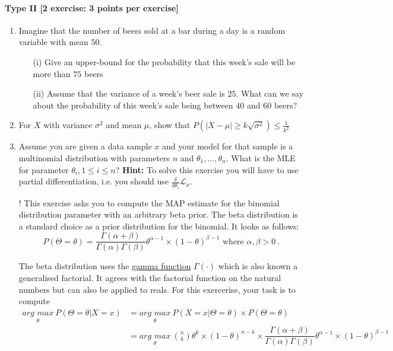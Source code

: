 \documentclass{article}
\begin{document}
\paragraph{Type II [2 exercise: 3 points per exercise]}
\begin{enumerate}
	\item Imagine that the number of beers sold at a bar during a day is a random variable with mean $50$.
		\begin{itemize}
			\item[(i)] Give an upper-bound for the probability that this week's sale will be more than $75$ beers
			\item[(ii)] Assume that the variance of a week's beer sale is $25$. What can we say about the probability of this week's sale being between $40$ and $60$ beers?
		\end{itemize}
	
	\item For $X$ with variance $\sigma^2$ and mean $\mu$, show that $P(|X-\mu| \geq k\sqrt{\sigma^2}) \leq \frac{1}{k^2}$
	
	\item Assume you are given a data sample $ x $ and your model for that sample is a multinomial distribution with parameters $ n $ and 
	$ \theta_{1}, \ldots, \theta_{n} $. What is the MLE for parameter $ \theta_{i}, 1 \leq i \leq n $? \textbf{Hint:} To solve this exercise you will
	have to use partial differentiation, i.e. you should use $ \frac{\delta}{\delta\theta_{i}}\mathcal{L}_{x} $.
	\item[\arabic{enumi}!] This exercise asks you to compute the MAP estimate for the binomial distribution parameter with an arbitrary beta prior. The beta distribution
	is a standard choice as a prior distribution for the binomial. It looks as follows:
	\begin{equation*}
	P(\Theta=\theta) = \dfrac{\Gamma(\alpha + \beta)}{\Gamma(\alpha)\Gamma(\beta)}\theta^{\alpha-1} \times (1-\theta)^{\beta-1} \mbox{ where } \alpha, \beta > 0 \ .
	\end{equation*}
	
	The beta distribution uses the \href{https://en.wikipedia.org/wiki/Gamma_function}{gamma function} $ \Gamma(\cdot) $ which is also known a generalised factorial.
	It agrees with the factorial function on the natural numbers but can also be applied to reals.	
	For this exercerise, your task is to compute
	\begin{align*}
	\underset{\theta}{arg\, \, max}~P(\Theta=\theta|X=x) &= \underset{\theta}{arg\, \, max}~P(X =x |\Theta = \theta) \times P(\Theta = \theta) \\
	&= \underset{\theta}{arg\, \, max}~\binom{n}{k}\theta^{k}\times (1-\theta)^{n-k} \times \dfrac{\Gamma(\alpha + \beta)}{\Gamma(\alpha)\Gamma(\beta)}\theta^{\alpha-1} \times (1-\theta)^{\beta-1}
	\end{align*}
\end{enumerate}
\end{document}

